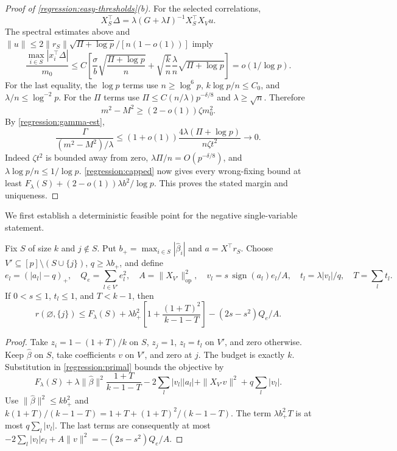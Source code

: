 \begin{proof}[Proof of \cref{regression:easy-thresholds}(b)]
For the selected correlations,
\[
 X_S^\top\Delta
 =\lambda(G+\lambda I)^{-1}X_S^\top X_Vu.
\]
The spectral estimates above and
$\|u\|\leq2\|r_S\|\sqrt{\Pi+\log p}/[n(1-o(1))]$ imply
\[
 \frac{\max_{i\in S}|x_i^\top\Delta|}{m_0}
 \leq C\left[
 \frac{\sigma}{b}\sqrt{\frac{\Pi+\log p}{n}}+
 \sqrt{\frac kn}\frac{\lambda}{n}\sqrt{\Pi+\log p}\right]
 =o(1/\log p).
\]
For the last equality, the $\log p$ terms use
$n\geq\log^6p$, $k\log p/n\leq C_0$, and
$\lambda/n\leq\log^{-2}p$. For the $\Pi$ terms use
$\Pi\leq C(n/\lambda)p^{-\delta/8}$ and $\lambda\geq\sqrt n$.
Therefore
\[
 m^2-M^2\geq(2-o(1))\zeta m_0^2.
\]
By \eqref{regression:gamma-est},
\[
 \frac{\Gamma}{(m^2-M^2)/\lambda}
 \leq(1+o(1))\frac{4\lambda(\Pi+\log p)}
                         {n\zeta t^2}\longrightarrow0.
\]
Indeed $\zeta t^2$ is bounded away from zero,
$\lambda\Pi/n=O(p^{-\delta/8})$, and
$\lambda\log p/n\leq1/\log p$.
\cref{regression:capped} now gives every wrong-fixing bound at least
$F_\lambda(S)+(2-o(1))\lambda b^2/\log p$.
This proves the stated margin and uniqueness.
\end{proof}

We first establish a deterministic feasible point for the negative
single-variable statement.

\begin{lemma}\label{regression:forced-primal}
Fix $S$ of size $k$ and $j\notin S$. Put
$b_+=\max_{i\in S}|\widehat\beta_i|$ and
$a=X^\top r_S$. Choose $V'\subseteq[p]\setminus(S\cup\{j\})$,
$q\geq\lambda b_+$, and define
\[
 e_l=(|a_l|-q)_+,\quad Q_e=\sum_{l\in V'}e_l^2,\quad
 A=\|X_{V'}\|_{\mathrm{op}}^2,\quad
 v_l=s\,\operatorname{sign}(a_l)e_l/A,\quad
 t_l=\lambda|v_l|/q,\quad T=\sum_lt_l .
\]
If $0<s\leq1$, $t_l\leq1$, and $T<k-1$, then
\begin{equation}\label{regression:forced-primal-eq}
 r(\varnothing,\{j\})\leq F_\lambda(S)+
 \lambda b_+^2\left[1+\frac{(1+T)^2}{k-1-T}\right]
                         -(2s-s^2)Q_e/A.
\end{equation}
\end{lemma}
\begin{proof}
Take $z_i=1-(1+T)/k$ on $S$, $z_j=1$, $z_l=t_l$ on $V'$,
and zero otherwise. Keep $\widehat\beta$ on $S$, take coefficients
$v$ on $V'$, and zero at $j$. The budget is exactly $k$.
Substitution in \eqref{regression:primal} bounds the objective by
\[
 F_\lambda(S)+\lambda\|\widehat\beta\|^2\frac{1+T}{k-1-T}
 -2\sum_l|v_l||a_l|+\|X_{V'}v\|^2+q\sum_l|v_l|.
\]
Use $\|\widehat\beta\|^2\leq kb_+^2$ and
$k(1+T)/(k-1-T)=1+T+(1+T)^2/(k-1-T)$.
The term $\lambda b_+^2T$ is at most $q\sum_l|v_l|$.
The last terms are consequently at most
$-2\sum_l|v_l|e_l+A\|v\|^2=-(2s-s^2)Q_e/A$.
\end{proof}

